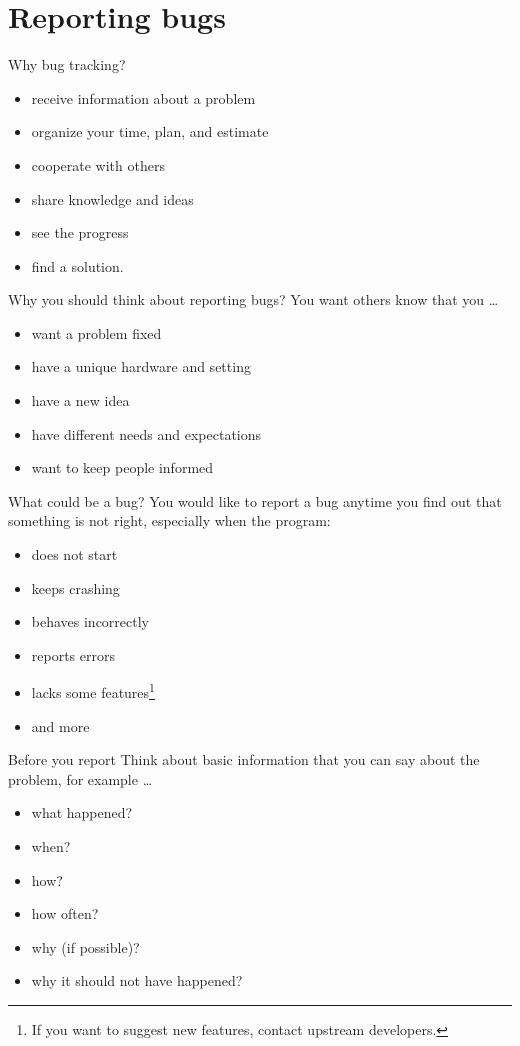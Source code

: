 \documentclass[12pt]{beamer}
\begin{document}
\section{Reporting bugs}
\begin{frame}{Why bug tracking?}

\begin{itemize}
	\item receive information about a problem
	\item organize your time, plan, and estimate
	\item cooperate with others
	\item share knowledge and ideas
	\item see the progress
	\item find a solution.
\end{itemize}
\end{frame}

\begin{frame}{Why you should think about reporting bugs?}
You want others know that you  \ldots{}
\begin{itemize}
	\item want a problem fixed
	\item have a unique hardware and setting
	\item have a new idea
	\item have different needs and expectations
	\item want to keep people informed
\end{itemize}

\end{frame}

\begin{frame}{What could be a bug?}
You would like to report a bug anytime you find out that something is not right, especially when the program:
\begin{itemize}
	\item does not start
	\item keeps crashing
	\item behaves incorrectly
	\item reports errors
	\item lacks some features\footnote{If you want to suggest new features, contact upstream developers.}
	\item and more
\end{itemize}

\end{frame}

\begin{frame}{Before you report}
Think about basic information that you can say about the problem, for example \ldots

\begin{itemize}
	\item what happened?
	\item when? 
	\item how? 
	\item how often?
	\item why (if possible)?
	\item why it should not have happened?
\end{itemize}	
\end{frame}
\end{document}
